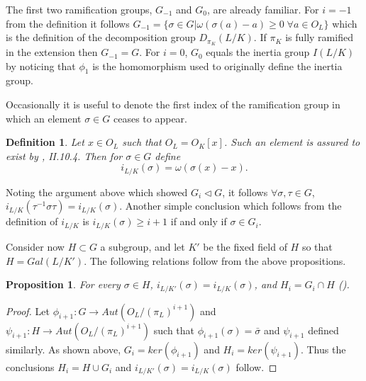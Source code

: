\documentclass[paper=a4, fontsize=11pt]{scrartcl} %
\numberwithin{equation}{section} %
\numberwithin{figure}{section} %
\numberwithin{table}{section} %
\theoremstyle{break}
\newtheorem{defn}{Definition}
\newtheorem{prop}{Proposition}
\begin{document}
The first two ramification groups, $G_{-1}$ and $G_0$, are already familiar. For $i=-1$ from the definition it follows $G_{-1} = \{\sigma \in G |\omega(\sigma(a)-a) \geq 0\;\forall a\in O_L\}$ which is the definition of the decomposition group $D_{\pi_K}(L/K)$. If $\pi_K$ is fully ramified in the extension then $G_{-1}=G$. For $i=0$, $G_{0}$ equals the inertia group $I(L/K)$ by noticing that $\phi_1$ is the homomorphism used to originally define the inertia group.

Occasionally it is useful to denote the first index of the ramification group in which an element $\sigma\in G$ ceases to appear. 
\begin{defn}
Let $x\in O_L$ such that $O_L=O_K[x]$. Such an element is assured to exist by \cite{Neukirch}, II.10.4. Then for $\sigma\in G$ define
$$
i_{L/K}(\sigma) = \omega(\sigma(x)-x).
$$
\end{defn}
Noting the argument above which showed $G_i \triangleleft G$, it follows $\forall \sigma,\tau \in G$, $i_{L/K}(\tau^{-1}\sigma \tau) = i_{L/K}(\sigma)$. Another simple conclusion which follows from the definition of $i_{L/K}$ is $i_{L/K}(\sigma)\geq i+1 $ if and only if $ \sigma\in G_i$.

Consider now $H\subset G$ a subgroup, and let $K'$ be the fixed field of $H$ so that $H=Gal(L/K')$. The following relations follow from the above propositions.
\begin{prop}
For every $\sigma\in H$, $i_{L/K'}(\sigma)=i_{L/K}(\sigma)$, and $H_i=G_i \cap H$ (\cite{Serre}).
\end{prop}
\begin{proof}
Let $\phi_{i+1}:G \to Aut(O_L/(\pi_L)^{i+1})$ and $\psi_{i+1}:H \to Aut(O_L/(\pi_L)^{i+1})$ such that $\phi_{i+1}(\sigma)=\bar{\sigma}$ and $\psi_{i+1}$ defined similarly. As shown above, $G_i = ker(\phi_{i+1})$ and $H_i = ker(\psi_{i+1})$. Thus the conclusions $H_i = H\cup G_i$ and $i_{L/K'}(\sigma)=i_{L/K}(\sigma)$ follow.
\end{proof}
\end{document}
